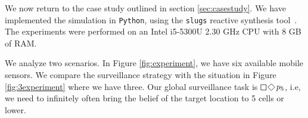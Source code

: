 We now return to the case study outlined in section \ref{sec:casestudy}. We have implemented the simulation in \texttt{Python}, using the \texttt{slugs} reactive synthesis tool~\cite{EhlersR16}. The experiments were performed on an Intel i5-5300U 2.30 GHz CPU with 8 GB of RAM.

 We analyze two scenarios. In Figure \ref{fig:experiment}, we have six available mobile sensors. We compare the surveillance strategy with the situation in Figure \ref{fig:3experiment} where we have three. Our global surveillance task is $\LTLsquare \LTLdiamond p_5$, i.e, we need to infinitely often bring the belief of the target location to 5 cells or lower. 

\begin{figure}
	\centering
{}
{}
\end{figure}
